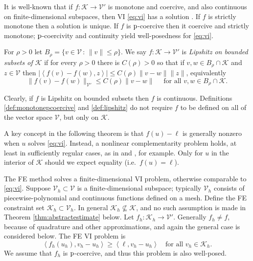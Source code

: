 \documentclass[hidelinks,onefignum,onetabnum,final]{siamart220329}  %
\newcommand{\cK}{\mathcal{K}}
\newcommand{\cV}{\mathcal{V}}
\newcommand{\pp}{{\text{\textnormal{p}}}}
\newcommand{\ip}[2]{\left<#1,#2\right>}
\begin{document}
It is well-known that if $f:\cK \to \cV'$ is monotone and coercive, and also continuous on finite-dimensional subspaces, then VI \eqref{eq:vi} has a solution \cite[Corollary III.1.8]{KinderlehrerStampacchia1980}.  If $f$ is strictly monotone then a solution is unique.  If $f$ is $\pp$-coercive then it coercive and strictly monotone; $\pp$-coercivity and continuity yield well-posedness for \eqref{eq:vi}.

\begin{definition} \label{def:lipshitz}
For $\rho>0$ let $B_\rho = \{v\in \cV\,:\,\|v\|\le \rho\}$.  We say $f:\cK \to \cV'$ is \emph{Lipshitz on bounded subsets of $\cK$} if for every $\rho>0$ there is $C(\rho)>0$ so that if $v,w \in B_\rho \cap \cK$ and $z\in\cV$ then $|\ip{f(v)-f(w)}{z}| \le C(\rho) \|v-w\| \|z\|$, equivalently
\begin{equation}
\|f(v)-f(w)\|_{\cV'} \le C(\rho) \|v-w\| \quad \text{ for all } v,w \in B_\rho \cap \cK.  \label{eq:liponbounded}
\end{equation}
\end{definition}

Clearly, if $f$ is Lipshitz on bounded subsets then $f$ is continuous.  Definitions \ref{def:monotonepcoercive} and \ref{def:lipshitz} do not require $f$ to be defined on all of the vector space $\cV$, but only on $\cK$.

A key concept in the following theorem is that $f(u)-\ell$ is generally nonzero when $u$ solves \eqref{eq:vi}.  Instead, a nonlinear complementarity problem holds, at least in sufficiently regular cases, as in \cite[Exercise 5.1.1]{Ciarlet2002}  and \cite[section 7]{BuelerFarrell2024}, for example.  Only for $u$ in the interior of $\cK$ should we expect equality (i.e.~$f(u)=\ell$).

The FE method solves a finite-dimensional VI problem, otherwise comparable to \eqref{eq:vi}.  Suppose $\cV_h \subset \cV$ is a finite-dimensional subspace; typically $\cV_h$ consists of piecewise-polynomial and continuous functions defined on a mesh.  Define the FE constraint set $\cK_h\subset \cV_h$.  In general $\cK_h \nsubseteq \cK$, and no such assumption is made in Theorem \ref{thm:abstractestimate} below.  Let $f_h:\cK_h\to\cV'$.  Generally $f_h\ne f$, because of quadrature and other approximations, and again the general case is considered below.  The FE VI problem is
\begin{equation}
\ip{f_h(u_h)}{v_h-u_h} \ge \ip{\ell}{v_h-u_h} \quad \text{for all } v_h\in \cK_h. \label{eq:fe:vi}
\end{equation}
We assume that $f_h$ is $\pp$-coercive, and thus this problem is also well-posed.
\end{document}
